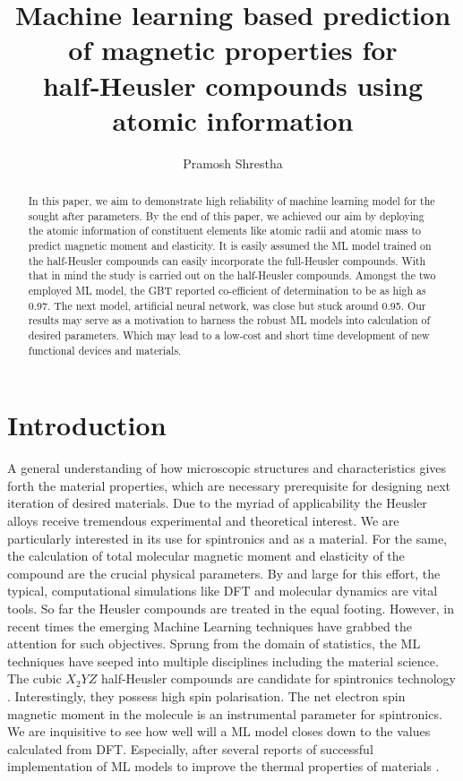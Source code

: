 \documentclass{article}
\title{Machine learning based prediction of magnetic properties for half‑Heusler compounds using atomic information}
\author{Pramosh Shrestha}
\begin{document}
\maketitle

\begin{abstract}
In this paper, we aim to demonstrate high reliability of machine learning model for the sought after parameters. By the end of this paper, we achieved our aim by deploying the atomic information of constituent elements like atomic radii and atomic mass to predict magnetic moment and elasticity. It is easily assumed the ML model trained on the half-Heusler compounds can easily incorporate the full-Heusler compounds. With that in mind the study is carried out on the half-Heusler compounds. Amongst the two employed ML model, the GBT reported co-efficient of determination to be as high as 0.97. The next model, artificial neural network, was close but stuck around 0.95. Our results may serve as a motivation to harness the robust ML models into calculation of desired parameters. Which may lead to a low‑cost and short time development of new functional devices and materials.
\end{abstract}

\section{Introduction}
A general understanding of how microscopic structures and characteristics gives forth the material properties, which are necessary prerequisite for designing next iteration of desired materials. Due to the myriad of applicability the Heusler alloys receive tremendous experimental and theoretical interest. We are particularly interested in its use for spintronics and as a material. For the same, the calculation of total molecular magnetic moment and elasticity of the compound are the crucial physical parameters. By and large for this effort, the typical, computational simulations like DFT and molecular dynamics are vital tools. So far the Heusler compounds are treated in the equal footing\cite{srivastava2020investigation, khandy2017dft}. However, in recent times the emerging Machine Learning techniques have grabbed the attention for such objectives. Sprung from the domain of statistics, the ML techniques have seeped into multiple disciplines including the material science. The cubic ${X_2YZ}$ half-Heusler compounds are candidate for spintronics technology \cite{de1983new, feng2014first, zhang2017two, ma2017computational, dehghan2019d0}. Interestingly, they possess high spin polarisation. The net electron spin magnetic moment in the molecule is an instrumental parameter for spintronics. We are inquisitive to see how well will a ML model closes down to the values calculated from DFT. Especially, after several reports of successful implementation of ML models to improve the thermal properties of materials \cite{wan2019materials, ouyang2020accuracy, ouyang2021machine, wang2021prediction, miyazaki2021machine}.
\end{document}
